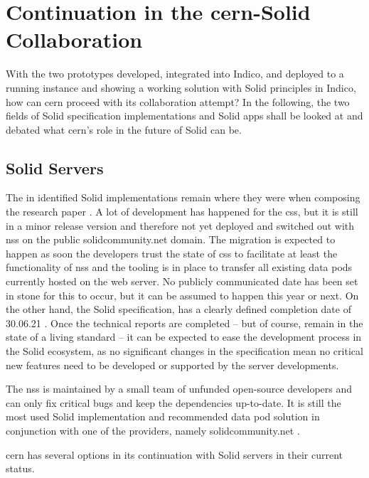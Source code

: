 \section{Continuation in the \gls{cern}-Solid Collaboration}

With the two prototypes developed, integrated into Indico, and deployed to a running instance and showing a working solution with Solid principles in Indico, how can \gls{cern} proceed with its collaboration attempt? In the following, the two fields of Solid specification implementations and Solid apps shall be looked at and debated what \gls{cern}'s role in the future of Solid can be.

\subsection{Solid Servers}

The in \cite{cern-solid-investigation-spec} identified Solid implementations remain where they were when composing the research paper \cite{cern-solid-investigation-spec}. A lot of development has happened for the \gls{css}, but it is still in a minor release version and therefore not yet deployed and switched out with \gls{nss} on the public solidcommunity.net domain. The migration is expected to happen as soon the developers trust the state of \gls{css} to facilitate at least the functionality of \gls{nss} and the tooling is in place to transfer all existing data pods currently hosted on the web server. No publicly communicated date has been set in stone for this to occur, but it can be assumed to happen this year or next. On the other hand, the Solid specification, has a clearly defined completion date of 30.06.21 \cite{solid-tr}. Once the technical reports are completed -- but of course, remain in the state of a living standard -- it can be expected to ease the development process in the Solid ecosystem, as no significant changes in the specification mean no critical new features need to be developed or supported by the server developments.

The \gls{nss} is maintained by a small team of unfunded open-source developers and can only fix critical bugs and keep the dependencies up-to-date. It is still the most used Solid implementation and recommended data pod solution in conjunction with one of the providers, namely solidcommunity.net \cite{solid-community}.

\gls{cern} has several options in its continuation with Solid servers in their current status.

